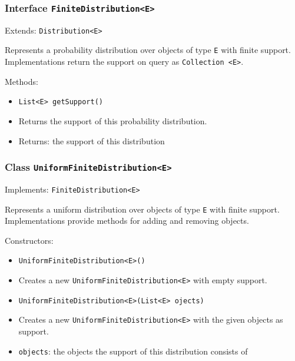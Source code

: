 \documentclass[parskip=full,11pt]{scrartcl}
\begin{document}
\subsubsection{Interface \texttt{FiniteDistribution<E>}}
Extends: \texttt{Distribution<E>}


Represents a probability distribution over objects of type \texttt{E} with finite support. Implementations return the support on query as \texttt{Collection <E>}.

Methods:
\begin{itemize}\itemsep -10pt
\item \texttt{List<E> getSupport()}
\item[] Returns the support of this probability distribution.
\item[] Returns: the support of this distribution
\end{itemize}

\subsubsection{Class \texttt{UniformFiniteDistribution<E>}}
Implements: \texttt{FiniteDistribution<E>}

Represents a uniform distribution over objects of type \texttt{E} with finite support. Implementations provide methods for adding and removing objects.

Constructors:
\begin{itemize}\itemsep -10pt
\item \texttt{UniformFiniteDistribution<E>()}
\item[] Creates a new \texttt{UniformFiniteDistribution<E>} with empty support.

\item \texttt{UniformFiniteDistribution<E>(List<E> ojects)}
\item[] Creates a new \texttt{UniformFiniteDistribution<E>} with the given objects as support.
\item[] \texttt{objects}: the objects the support of this distribution consists of
\end{itemize}
\end{document}
